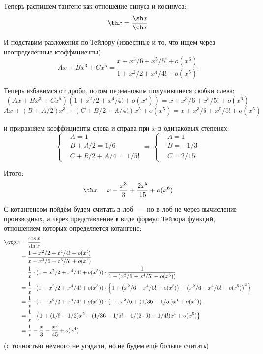 \documentclass[a4paper,12pt]{article}
\begin{document}
\begin{solution}
    Теперь распишем тангенс как отношение синуса и косинуса:
    \[
      \th x = \frac{\sh x}{\ch x}
    \]

    И подставим разложения по Тейлору (известные и то, что ищем через неопределённые коэффициенты):
    \[
      A x + B x^3 + C x^5 = \frac{x + x^3/6 + x^5/5! + o(x^6)}{1 + x^2/2 + x^4/4! + o(x^5)}
    \]

    Теперь избавимся от дроби, потом перемножим получившиеся скобки слева:
    \[
      (A x + B x^3 + C x^5)(1 + x^2/2 + x^4/4! + o(x^5)) = x + x^3/6 + x^5/5! + o(x^6)
    \]
    \[
      A x + (B + A/2) x^3 + (C + B/2 + A/4!) x^5 + o(x^5) = x + x^3/6 + x^5/5! + o(x^5)
    \]

    и приравняем коэффициенты слева и справа при $x$ в одинаковых степенях:
    \[
      \left\{
        \begin{aligned}
          &A = 1\\
          &B + A/2 = 1/6\\
          &C + B/2 + A/4! = 1/5!
        \end{aligned}
      \right. \Rightarrow \left\{
        \begin{aligned}
          &A = 1\\
          &B = -1/3\\
          &C = 2/15
        \end{aligned}
      \right.
    \]

    Итого:
    \[
      \th x = x - \frac{x^3}{3} + \frac{2 x^5}{15} + o(x^6)
    \]

    \medskip

    С котангенсом пойдём будем считать в лоб~---~но в лоб не через вычисление производных, а через представление в виде формул Тейлора функций, отношением которых определяется котангенс:
    \begin{equation*}
    \begin{split}
      \ctg x &= \frac{\cos x}{\sin x}\\
        &= \frac{1 - x^2/2 + x^4/4! + o(x^5)}{x - x^3/6 + x^5/5! + o(x^6)}\\
        &= \frac{1}{x} \cdot (1 - x^2/2 + x^4/4! + o(x^5)) \cdot \frac{1}{1 - \left(x^2/6 - x^4/5! - o(x^5)\right)}\\
        &= \frac{1}{x} \cdot (1 - x^2/2 + x^4/4! + o(x^5)) \cdot \left\{1 + \left(x^2/6 - x^4/5! + o(x^5)\right) + \left(x^2/6 - x^4/5! - o(x^5)\right)^2\right\}\\
        &= \frac{1}{x} \cdot (1 - x^2/2 + x^4/4! + o(x^5)) \cdot \left(1 + x^2/6 + (1/36 - 1/5!) x^4 + o(x^5)\right)\\
        &= \frac{1}{x} \cdot \left\{1 + (1/6 - 1/2) x^2 + (1/36 - 1/5! - 1/(2 \cdot 6) + 1/4!) x^4 + o(x^5)\right\}\\
        &= \frac{1}{x} - \frac{x}{3} - \frac{x^3}{45} + o(x^4) 
    \end{split}
    \end{equation*}
    (с точностью немного не угадали, но не будем ещё больше считать)


\end{solution}
\end{document}
